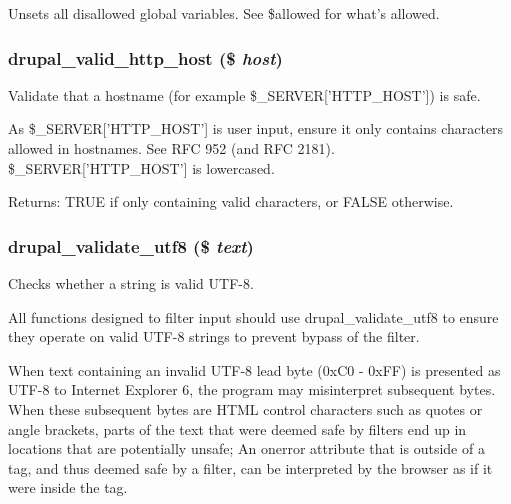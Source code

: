 Unsets all disallowed global variables. See \$allowed for what's allowed. \hypertarget{bootstrap_8inc_e65d9d5f6c34309eb884e51fd39ffb6d}{
\subsubsection[{drupal\_\-valid\_\-http\_\-host}]{\setlength{\rightskip}{0pt plus 5cm}drupal\_\-valid\_\-http\_\-host (\$ {\em host})}}
\label{bootstrap_8inc_e65d9d5f6c34309eb884e51fd39ffb6d}


Validate that a hostname (for example \$\_\-SERVER\mbox{[}'HTTP\_\-HOST'\mbox{]}) is safe.

As \$\_\-SERVER\mbox{[}'HTTP\_\-HOST'\mbox{]} is user input, ensure it only contains characters allowed in hostnames. See RFC 952 (and RFC 2181). \$\_\-SERVER\mbox{[}'HTTP\_\-HOST'\mbox{]} is lowercased.

\begin{Desc}
\item[Returns:]TRUE if only containing valid characters, or FALSE otherwise. \end{Desc}
\hypertarget{bootstrap_8inc_bf62947a33393477301b0070b1ff0c7a}{
\subsubsection[{drupal\_\-validate\_\-utf8}]{\setlength{\rightskip}{0pt plus 5cm}drupal\_\-validate\_\-utf8 (\$ {\em text})}}
\label{bootstrap_8inc_bf62947a33393477301b0070b1ff0c7a}


Checks whether a string is valid UTF-8.

All functions designed to filter input should use drupal\_\-validate\_\-utf8 to ensure they operate on valid UTF-8 strings to prevent bypass of the filter.

When text containing an invalid UTF-8 lead byte (0xC0 - 0xFF) is presented as UTF-8 to Internet Explorer 6, the program may misinterpret subsequent bytes. When these subsequent bytes are HTML control characters such as quotes or angle brackets, parts of the text that were deemed safe by filters end up in locations that are potentially unsafe; An onerror attribute that is outside of a tag, and thus deemed safe by a filter, can be interpreted by the browser as if it were inside the tag.

